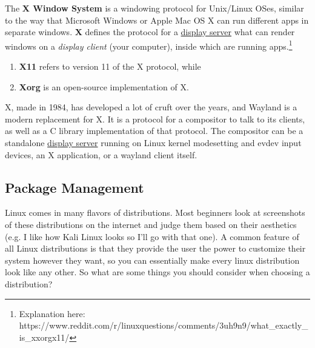   \begin{definition}
    \label{def:x-window-system}
    The \textbf{X Window System} is a windowing protocol for Unix/Linux OSes, similar to the way that Microsoft Windows or Apple Mac OS X can run different apps in separate windows. \textbf{X} defines the protocol for a \hyperref[def:display-server]{display server} what can render windows on a \textit{display client} (your computer), inside which are running apps.\footnote{Explanation here: https://www.reddit.com/r/linuxquestions/comments/3uh9n9/what\_exactly\_is\_xxorgx11/} 
    \begin{enumerate} 
      \item \textbf{X11} refers to version 11 of the X protocol, while 
      \item \textbf{Xorg} is an open-source implementation of X. 
    \end{enumerate}
  \end{definition}

  \begin{definition}[Wayland]
    \label{def:wayland}
    X, made in 1984, has developed a lot of cruft over the years, and Wayland is a modern replacement for X. It is a protocol for a compositor to talk to its clients, as well as a C library implementation of that protocol. The compositor can be a standalone \hyperref[def:display-server]{display server} running on Linux kernel modesetting and evdev input devices, an X application, or a wayland client itself. 
  \end{definition}

\subsection{Package Management}
  
  Linux comes in many flavors of distributions. Most beginners look at screenshots of these distributions on the internet and judge them based on their aesthetics (e.g. I like how Kali Linux looks so I'll go with that one). A common feature of all Linux distributions is that they provide the user the power to customize their system however they want, so you can essentially make every linux distribution look like any other. So what are some things you should consider when choosing a distribution? 

